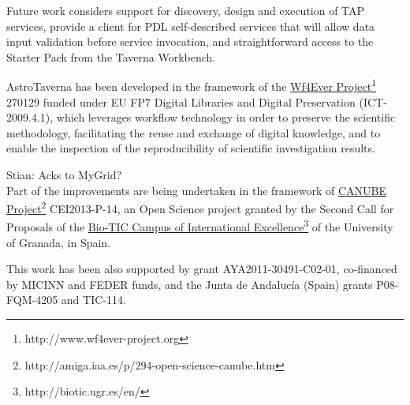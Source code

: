 \documentclass{aa}
\begin{document}
Future work considers support for discovery, design and execution of TAP services, provide a client for PDL self-described services that will allow data input validation before service invocation, and straightforward access to the Starter Pack from the Taverna Workbench.

\begin{acknowledgements}

AstroTaverna has been developed in the framework of the \href{http://www.wf4ever-project.org}{Wf4Ever Project}\footnote{http://www.wf4ever-project.org} 270129 funded under EU FP7 Digital Libraries and Digital Preservation (ICT-2009.4.1), which leverages workflow technology in order to preserve the scientific methodology, facilitating the reuse and exchange of digital knowledge, and to enable the inspection of the reproducibility of scientific investigation results.

{\color{red}Stian: Acks to MyGrid?}\\

Part of the improvements are being undertaken in the framework of \href{http://amiga.iaa.es/p/294-open-science-canube.htm}{CANUBE Project}\footnote{http://amiga.iaa.es/p/294-open-science-canube.htm} CEI2013-P-14, an Open Science project granted by the Second Call for Proposals of the \href{http://biotic.ugr.es/en/}{Bio-TIC Campus of International Excellence}\footnote{http://biotic.ugr.es/en/} of the University of Granada, in Spain.

This work has been also supported by grant AYA2011-30491-C02-01, co-financed by MICINN and FEDER funds, and the Junta de Andalucía (Spain) grants P08-FQM-4205 and TIC-114.

\end{acknowledgements}


\end{document}
